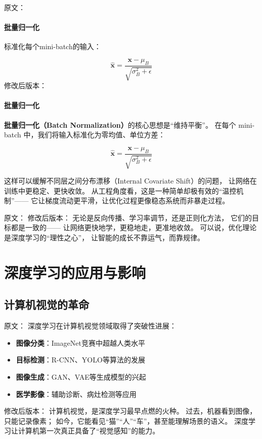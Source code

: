 原文：
\paragraph{批量归一化}
标准化每个mini-batch的输入：

$$\hat{\mathbf{x}} = \frac{\mathbf{x} - \mu_B}{\sqrt{\sigma_B^2 + \epsilon}}$$
修改后版本：
\paragraph{批量归一化}  
\textbf{批量归一化（Batch Normalization）}的核心思想是“维持平衡”。  
在每个 mini-batch 中，我们将输入标准化为零均值、单位方差：  

$$\hat{\mathbf{x}} = \frac{\mathbf{x} - \mu_B}{\sqrt{\sigma_B^2 + \epsilon}}$$

这样可以缓解不同层之间分布漂移（Internal Covariate Shift）的问题，  
让网络在训练中更稳定、更快收敛。  
从工程角度看，这是一种简单却极有效的“温控机制”——  
它让梯度流动更平滑，让优化过程更像稳态系统而非暴走过程。



原文：
修改后版本：
无论是反向传播、学习率调节，还是正则化方法，  
它们的目标都是一致的——  
让网络更快地学，更稳地走，更准地收敛。  
可以说，优化理论是深度学习的“理性之心”，  
让智能的成长不靠运气，而靠规律。

\section{深度学习的应用与影响}

\subsection{计算机视觉的革命}

原文：
深度学习在计算机视觉领域取得了突破性进展：

\begin{itemize}
\item \textbf{图像分类}：ImageNet竞赛中超越人类水平
\item \textbf{目标检测}：R-CNN、YOLO等算法的发展
\item \textbf{图像生成}：GAN、VAE等生成模型的兴起
\item \textbf{医学影像}：辅助诊断、病灶检测等应用
\end{itemize}
修改后版本：
计算机视觉，是深度学习最早点燃的火种。  
过去，机器看到图像，只能记录像素；  
如今，它能看见“猫”“人”“车”，甚至能理解场景的语义。  
深度学习让计算机第一次真正具备了“视觉感知”的能力。

